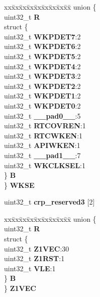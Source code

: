 \begin{DoxyCompactItemize}
\begin{tabbing}
\end{tabbing}\item 
\mbox{\label{structCRP__tag_a4fe312a953a19d2101a789e63144f2cd}} 
\begin{tabbing}
xx\=xx\=xx\=xx\=xx\=xx\=xx\=xx\=xx\=\kill
union \{\\
\>uint32\_t {\bfseries R}\\
\>struct \{\\
\>\>uint32\_t {\bfseries WKPDET7}:2\\
\>\>uint32\_t {\bfseries WKPDET6}:2\\
\>\>uint32\_t {\bfseries WKPDET5}:2\\
\>\>uint32\_t {\bfseries WKPDET4}:2\\
\>\>uint32\_t {\bfseries WKPDET3}:2\\
\>\>uint32\_t {\bfseries WKPDET2}:2\\
\>\>uint32\_t {\bfseries WKPDET1}:2\\
\>\>uint32\_t {\bfseries WKPDET0}:2\\
\>\>uint32\_t {\bfseries \_\_pad0\_\_}:5\\
\>\>uint32\_t {\bfseries RTCOVREN}:1\\
\>\>uint32\_t {\bfseries RTCWKEN}:1\\
\>\>uint32\_t {\bfseries APIWKEN}:1\\
\>\>uint32\_t {\bfseries \_\_pad1\_\_}:7\\
\>\>uint32\_t {\bfseries WKCLKSEL}:1\\
\>\} {\bfseries B}\\
\} {\bfseries WKSE}\\

\end{tabbing}\item 
\mbox{\label{structCRP__tag_a0485dc1412b60d3786ba9707b9311be3}} 
uint32\+\_\+t {\bfseries crp\+\_\+reserved3} \mbox{[}2\mbox{]}
\item 
\mbox{\label{structCRP__tag_abdaf962635f6a600050d733477ae280f}} 
\begin{tabbing}
xx\=xx\=xx\=xx\=xx\=xx\=xx\=xx\=xx\=\kill
union \{\\
\>uint32\_t {\bfseries R}\\
\>struct \{\\
\>\>uint32\_t {\bfseries Z1VEC}:30\\
\>\>uint32\_t {\bfseries Z1RST}:1\\
\>\>uint32\_t {\bfseries VLE}:1\\
\>\} {\bfseries B}\\
\} {\bfseries Z1VEC}\\


\end{tabbing}
\end{DoxyCompactItemize}
